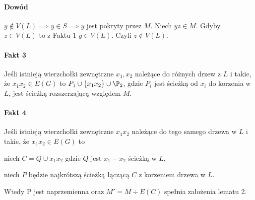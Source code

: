 \paragraph{Dowód}
$y \not\in V(L) \implies y \in S \implies y$ jest pokryty przez $M$. Niech $yz \in M$. 
Gdyby $z \in V(L)$ to z Faktu 1 $y \in V(L)$. Czyli $z \not\in V(L)$.

\paragraph{Fakt 3}
Jeśli istnieją wierzchołki zewnętrzne $x_1, x_2$ należące do różnych drzew z $L$ i takie, że $x_1x_2 \in E(G)$ to $P_1 \cup \{x_1x_2\} \cup \P_2$, gdzie $P_i$ jest ścieżką od $x_i$ do korzenia w $L$, jest ścieżką rozszerzającą względem $M$.


\paragraph{Fakt 4}
Jeśli istnieją wierzchołki zewnętrzne $x_1x_2$ należące do tego samego drzewa w $L$ i takie, że $x_1x_2 \in E(G)$ to 

niech $C = Q \cup {x_1x_2}$ gdzie $Q$ jest $x_1 - x_2$ ścieżką w $L$,

niech $P$ będzie najkrótszą ścieżką łączącą $C$ z korzeniem drzewa w $L$.

Wtedy P jest naprzemienna oraz $M' = M \div E(C)$ spełnia założenia lematu 2.





